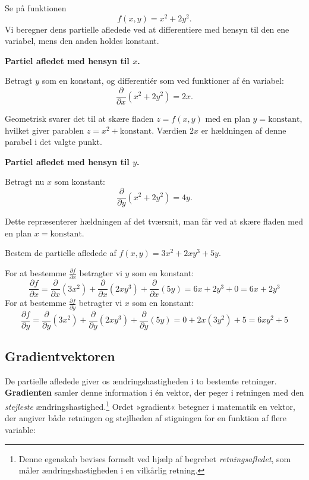 \begin{example}
    Se på funktionen 
    \[
        f(x,y) = x^{2} + 2y^{2}.
    \]
    Vi beregner dens partielle afledede ved at differentiere med hensyn til den ene variabel, mens den anden holdes konstant.

    \textbf{Partiel afledet med hensyn til \(x\).}

    Betragt \(y\) som en konstant, og differentiér som ved funktioner af én variabel:
    \[
        \frac{\partial}{\partial x}(x^{2} + 2y^{2}) 
        = 2x.
    \]

    Geometrisk svarer det til at skære fladen \(z=f(x,y)\) med en plan \(y=\text{konstant}\), hvilket giver parablen \(z=x^{2}+\text{konstant}\). Værdien \(2x\) er hældningen af denne parabel i det valgte punkt.

    \textbf{Partiel afledet med hensyn til \(y\).} 

    Betragt nu \(x\) som konstant:
    \[
        \frac{\partial}{\partial y}(x^{2} + 2y^{2})
        = 4y.
    \]

    Dette repræsenterer hældningen af det tværsnit, man får ved at skære fladen med en plan \(x=\text{konstant}\).

\end{example}

\begin{example}
    Bestem de partielle afledede af \( f(x, y) = 3x^2 + 2xy^3 + 5y \).
\end{example}

\begin{solution}
    
For at bestemme \( \frac{\partial f}{\partial x} \) betragter vi \( y \) som en konstant:
\[
\frac{\partial f}{\partial x} = \frac{\partial}{\partial x}(3x^2) + \frac{\partial}{\partial x}(2xy^3) + \frac{\partial}{\partial x}(5y) = 6x + 2y^3 + 0 = 6x + 2y^3
\]
For at bestemme \( \frac{\partial f}{\partial y} \) betragter vi \( x \) som en konstant:
\[
\frac{\partial f}{\partial y} = \frac{\partial}{\partial y}(3x^2) + \frac{\partial}{\partial y}(2xy^3) + \frac{\partial}{\partial y}(5y) = 0 + 2x(3y^2) + 5 = 6xy^2 + 5
\]
\end{solution}

\subsection*{Gradientvektoren}

De partielle afledede giver os ændringshastigheden i to bestemte retninger. \textbf{Gradienten} samler denne information i én vektor, der peger i retningen med den \emph{stejleste} ændringshastighed.\footnote{Denne egenskab bevises formelt ved hjælp af begrebet \textit{retningsafledet}, som måler ændringshastigheden i en vilkårlig retning.} Ordet »gradient« betegner i matematik en vektor, der angiver både retningen og stejlheden af stigningen for en funktion af flere variable:

